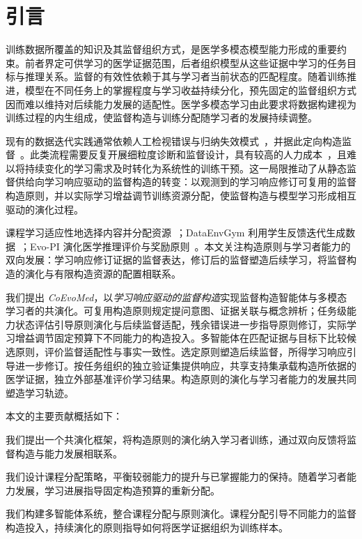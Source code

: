 \section{引言}
\label{sec:intro}

训练数据所覆盖的知识及其监督组织方式，是医学多模态模型能力形成的重要约束。前者界定可供学习的医学证据范围，后者组织模型从这些证据中学习的任务目标与推理关系。监督的有效性依赖于其与学习者当前状态的匹配程度。随着训练推进，模型在不同任务上的掌握程度与学习收益持续分化，预先固定的监督组织方式因而难以维持对后续能力发展的适配性。医学多模态学习由此要求将数据构建视为训练过程的内生组成，使监督构造与训练分配随学习者的发展持续调整。

现有的数据迭代实践通常依赖人工检视错误与归纳失效模式~\citep{wu2019errudite}，并据此定向构造监督~\citep{khan2025dataenvgym}。此类流程需要反复开展细粒度诊断和监督设计，具有较高的人力成本~\citep{ribeiro2022adaptive}，且难以将持续变化的学习需求及时转化为系统性的训练干预。这一局限推动了从静态监督供给向学习响应驱动的监督构造的转变：以观测到的学习响应修订可复用的监督构造原则，并以实际学习增益调节训练资源分配，使监督构造与模型学习形成相互驱动的演化过程。

课程学习适应性地选择内容并分配资源~\citep{bengio2009curriculum,matiisen2017teacher}；DataEnvGym 利用学生反馈迭代生成数据~\citep{khan2025dataenvgym}；Evo-PI 演化医学推理评价与奖励原则~\citep{zheng2026evopi}。本文关注构造原则与学习者能力的双向发展：学习响应修订证据的监督表达，修订后的监督塑造后续学习，将监督构造的演化与有限构造资源的配置相联系。

我们提出 \emph{CoEvoMed}，以\emph{学习响应驱动的监督构造}实现监督构造智能体与多模态学习者的共演化。可复用构造原则规定提问意图、证据关联与概念辨析；任务级能力状态评估引导原则演化与后续监督适配，残余错误进一步指导原则修订，实际学习增益调节固定预算下不同能力的构造投入。多智能体在匹配证据与目标下比较候选原则，评价监督适配性与事实一致性。选定原则塑造后续监督，所得学习响应引导进一步修订。按任务组织的独立验证集提供响应，共享支持集承载构造所依据的医学证据，独立外部基准评价学习结果。构造原则的演化与学习者能力的发展共同塑造学习轨迹。

本文的主要贡献概括如下：

\noindent\textbullet\enspace 我们提出一个共演化框架，将构造原则的演化纳入学习者训练，通过双向反馈将监督构造与能力发展相联系。

\noindent\textbullet\enspace 我们设计课程分配策略，平衡较弱能力的提升与已掌握能力的保持。随着学习者能力发展，学习进展指导固定构造预算的重新分配。

\noindent\textbullet\enspace 我们构建多智能体系统，整合课程分配与原则演化。课程分配引导不同能力的监督构造投入，持续演化的原则指导如何将医学证据组织为训练样本。


